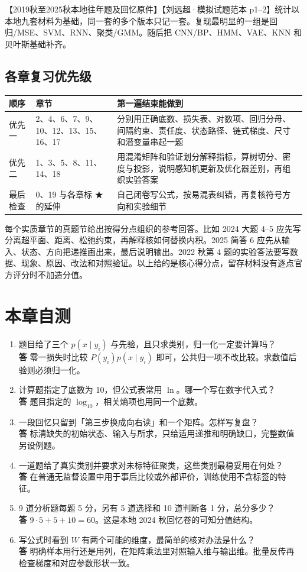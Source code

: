 \documentclass[UTF8,a4paper,zihao=-4,fontset=fandol]{ctexrep}
\begin{document}
【2019秋至2025秋本地往年题及回忆原件】【刘远超·模拟试题范本 p1–2】统计以本地九套材料为基础，同一套的多个版本只记一套。复现最明显的一组是回归/MSE、SVM、RNN、聚类/GMM。随后把 CNN/BP、HMM、VAE、KNN 和贝叶斯基础补齐。

\subsection{各章复习优先级}
\begin{tabularx}{\linewidth}{@{}p{.13\linewidth}p{.30\linewidth}X@{}}
\toprule
顺序 & 章节 & 第一遍结束能做到\\
\midrule
优先一 & 2、4、6、7、9、10、12、13、15、16、17 & 分别用正确底数、损失表、对数项、回归分母、间隔约束、责任度、状态路径、链式梯度、尺寸和潜变量串起一题\\
优先二 & 1、3、5、8、11、14、18 & 用混淆矩阵和验证划分解释指标，算树切分、密度与投影，说明感知机更新及优化器差别，再组织实验答案\\
最后检查 & 0、19 与各章标 ★ 的延伸 & 自己闭卷写公式，按易混表纠错，再复核符号方向和实验细节\\
\bottomrule
\end{tabularx}

每个实质章节的真题节给出按得分点组织的参考回答。比如 2024 大题 4–5 应先写分离超平面、距离、松弛约束，再解释核如何替换内积。2025 简答 6 应先从输入、状态、方向把递推画出来，最后说明输出。2022 秋第 4 题的实验答法要写数据、现象、原因、改法和对照验证。以上给的是核心得分点，留存材料没有逐点官方评分时不加造分值。

\section{本章自测}
\begin{enumerate}
\item 题目给了三个 $p(x\mid y_i)$ 与先验，且只求类别，归一化一定要计算吗？\\
\textbf{答} 零一损失时比较 $P(y_i)p(x\mid y_i)$ 即可，公共归一项不改比较。求数值后验则必须归一化。
\item 计算题指定了底数为 10，但公式表常用 $\ln$。哪一个写在数字代入式？\\
\textbf{答} 题目指定的 $\log_{10}$，相关熵项也用同一个底数。
\item 一段回忆只留到「第三步换成向右读」和一个矩阵。怎样写复盘？\\
\textbf{答} 标清缺失的初始状态、输入与所求，只给适用递推和明确缺口，完整数值另设例题。
\item 一道题给了真实类别并要求对未标特征聚类，这些类别最稳妥用在何处？\\
\textbf{答} 在普通无监督设置中用于事后比较或外部评价，训练使用不含标签的特征。
\item 9 道分析题每题 5 分，另有 5 道选择和 10 道判断各 1 分，总分多少？\\
\textbf{答} $9\cdot5+5+10=60$。这是本地 2024 秋回忆卷的可知分值结构。
\item 写公式时看到 $W$ 有两个可能的维度，最简单的核对办法是什么？\\
\textbf{答} 明确样本用行还是用列，在矩阵乘法里对照输入维与输出维。批量反传再检查梯度和对应参数形状一致。
\end{enumerate}
\end{document}
